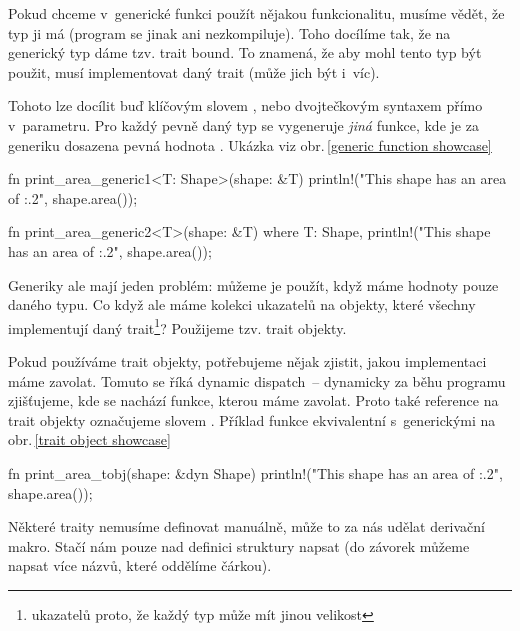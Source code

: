 \documentclass[main.tex]{subfiles}
\begin{document}

Pokud chceme v~generické funkci použít nějakou funkcionalitu, musíme vědět, že typ ji má
(program se jinak ani nezkompiluje). Toho docílíme tak, že na generický typ dáme tzv.
trait bound. To znamená, že aby mohl tento typ být použit, musí implementovat daný trait
(může jich být i~víc). \cite[sekce\,10.2]{thebook}

Tohoto lze docílit buď klíčovým slovem , nebo dvojtečkovým syntaxem přímo
v~parametru. Pro každý pevně daný typ se vygeneruje \emph{jiná} funkce, kde je za generiku
dosazena pevná hodnota \cite[sekce\,10.1]{thebook}.
Ukázka viz obr.\,\ref{generic function showcase}

\obrazek
\begin{rustcode}
    fn print_area_generic1<T: Shape>(shape: &T) {
        println!("This shape has an area of {:.2}", shape.area());
    }

    fn print_area_generic2<T>(shape: &T)
    where
        T: Shape,
    {
        println!("This shape has an area of {:.2}", shape.area());
    }
\end{rustcode}


Generiky ale mají jeden problém: můžeme je použít, když máme hodnoty pouze daného typu.
Co když ale máme kolekci ukazatelů na objekty, které všechny implementují daný
trait\footnote{ukazatelů proto, že každý typ může mít jinou velikost}? Použijeme tzv.
trait objekty.

Pokud používáme trait objekty, potřebujeme nějak zjistit, jakou implementaci máme zavolat.
Tomuto se říká dynamic dispatch~-- dynamicky za běhu programu zjišťujeme, kde se nachází
funkce, kterou máme zavolat. Proto také reference na trait objekty označujeme slovem
. \cite[sekce\,17.2]{thebook} Příklad funkce ekvivalentní s~generickými na
obr.\,\ref{trait object showcase}

\obrazek
\begin{rustcode}
    fn print_area_tobj(shape: &dyn Shape) {
        println!("This shape has an area of {:.2}", shape.area());
    }
\end{rustcode}


Některé traity nemusíme definovat manuálně, může to za nás udělat derivační makro. Stačí
nám pouze nad definici struktury napsat  (do závorek můžeme
napsat více názvů, které oddělíme čárkou). \cite[sekce\,5.2]{thebook}
\end{document}
